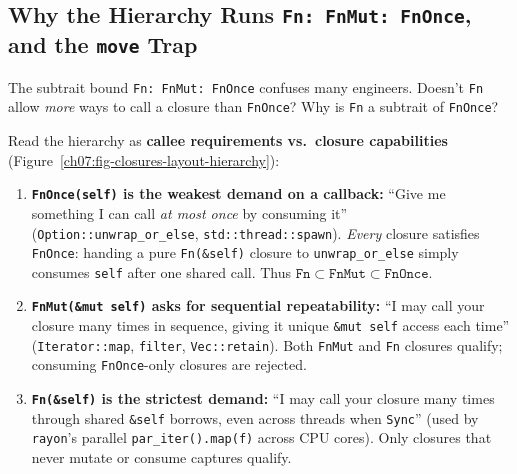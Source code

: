 \subsection{Why the Hierarchy Runs \texttt{Fn: FnMut: FnOnce}, and the \texttt{move} Trap}

The subtrait bound \texttt{Fn: FnMut: FnOnce} confuses many engineers. Doesn't \texttt{Fn} allow \emph{more} ways to call a closure than \texttt{FnOnce}? Why is \texttt{Fn} a subtrait of \texttt{FnOnce}?

Read the hierarchy as \textbf{callee requirements vs.\ closure capabilities}
(Figure~\ref{ch07:fig-closures-layout-hierarchy}):
\begin{enumerate}
  \item \textbf{\texttt{FnOnce(self)} is the weakest demand on a callback:} ``Give me something I can call \emph{at most once} by consuming it'' (\texttt{Option::unwrap\_or\_else}, \texttt{std::thread::spawn}). \emph{Every} closure satisfies \texttt{FnOnce}: handing a pure \texttt{Fn(\&self)} closure to \texttt{unwrap\_or\_else} simply consumes \texttt{self} after one shared call. Thus $\texttt{Fn} \subset \texttt{FnMut} \subset \texttt{FnOnce}$.
  \item \textbf{\texttt{FnMut(\&mut self)} asks for sequential repeatability:} ``I may call your closure many times in sequence, giving it unique \texttt{\&mut self} access each time'' (\texttt{Iterator::map}, \texttt{filter}, \texttt{Vec::retain}). Both \texttt{FnMut} and \texttt{Fn} closures qualify; consuming \texttt{FnOnce}-only closures are rejected.
  \item \textbf{\texttt{Fn(\&self)} is the strictest demand:} ``I may call your closure many times through shared \texttt{\&self} borrows, even across threads when \texttt{Sync}'' (used by \texttt{rayon}'s parallel \texttt{par\_iter().map(f)} across CPU cores). Only closures that never mutate or consume captures qualify.
\end{enumerate}

